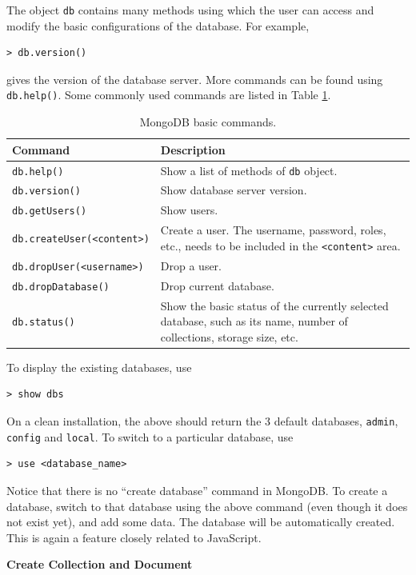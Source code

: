 The object \verb|db| contains many methods using which the user can access and modify the basic configurations of the database. For example,
\begin{lstlisting}
> db.version()
\end{lstlisting}
gives the version of the database server. More commands can be found using \verb|db.help()|. Some commonly used commands are listed in Table \ref{ch:db:tab:mongodbbasics}.
\begin{table}
	\centering \caption{MongoDB basic commands.}\label{ch:db:tab:mongodbbasics}
	\begin{tabularx}{\textwidth}{lX}
		\hline
		Command & Description \\ \hline
        \verb|db.help()| & Show a list of methods of \verb|db| object. \\ 
		\verb|db.version()| & Show database server version. \\ 
        \verb|db.getUsers()| & Show users. \\ 
        \verb|db.createUser(<content>)| & Create a user. The username, password, roles, etc., needs to be included in the \verb|<content>| area. \\ 
        \verb|db.dropUser(<username>)| & Drop a user. \\ 
        \verb|db.dropDatabase()| & Drop current database. \\ 
		\verb|db.status()| & Show the basic status of the currently selected database, such as its name, number of collections, storage size, etc.  \\
		 \hline
	\end{tabularx}
\end{table}

To display the existing databases, use
\begin{lstlisting}
> show dbs
\end{lstlisting}
On a clean installation, the above should return the 3 default databases, \verb|admin|, \verb|config| and \verb|local|. To switch to a particular database, use
\begin{lstlisting}
> use <database_name>
\end{lstlisting}
Notice that there is no ``create database'' command in MongoDB. To create a database, switch to that database using the above command (even though it does not exist yet), and add some data. The database will be automatically created. This is again a feature closely related to JavaScript.

\vspace{0.1in}
\noindent \textbf{Create Collection and Document}
\vspace{0.1in}

